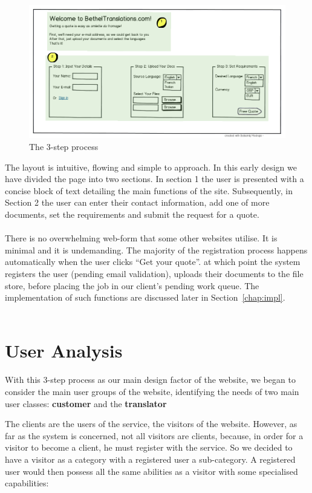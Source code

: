 \documentclass{l3proj}
\begin{document}
\begin{figure}
\begin{center}
\includegraphics[width=\linewidth]{wireframes/bt-3step}
\caption{The 3-step process}
\end{center}
\end{figure}

The layout is intuitive, flowing and simple to approach. In this early design we
have divided the page into two sections. In section 1 the user is presented with
a concise block of text detailing the main functions of the site.
Subsequently, in Section 2 the user can enter their contact information, add
one of more documents, set the requirements and submit the request for a quote.\\
\\
There is no overwhelming web-form that some other websites utilise. It is minimal and
it is undemanding. The majority of the registration process happens
automatically when the user clicks ``Get your quote''. at which point the system
registers the user (pending email validation), uploads their documents to the
file store, before placing the job in
our client's pending work queue. The implementation of such functions are
discussed later in Section~\ref{chap:impl}.\\
\\


\section{User Analysis}
\label{sect:user-analysis}
With this 3-step process as our main design factor of the website, we began to
consider the main user groups of the website, identifying the needs of two
main user classes: \textbf{customer} and the \textbf{translator}

The clients are the users of the service, the visitors of the website. However,
as far as the system is concerned, not all visitors are clients, because, in
order for a visitor to become a client, he must register with the service. So we
decided to have a visitor as a category with a registered user a sub-category. A
registered user would then possess all the same abilities as a visitor with some
specialised capabilities:
\end{document}

